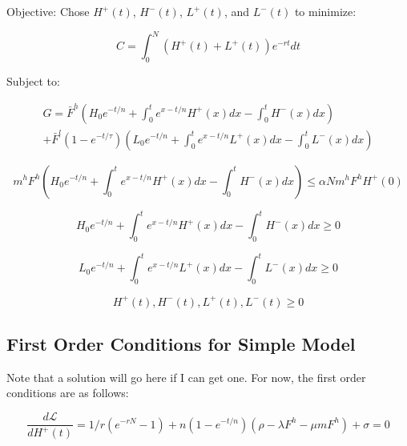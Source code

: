 \documentclass[singlespace]{easychithesis}
\newcommand{\Lagr}{\mathcal{L}}
\begin{document}
Objective: Chose $H^+(t)$, $H^-(t)$, $L^+(t)$, and $L^-(t)$ to minimize:

\begin{equation}\label{eq:analyticalObj}
C = \int_0^N (H^+(t) + L^+(t))e^{-rt} dt
\end{equation}

Subject to: 

\begin{multline}\label{eq:analyticalGen}
G = \bar{F}^h\left (H_0 e^{-t/n} + \int_0^t e^{x-t/n} H^+(x) dx - \int_0^t H^-(x)dx \right) \\ + \bar{F}^l(1-e^{-t/\tau}) \left ( L_0 e^{-t/n} + \int_0^t e^{x-t/n} L^+(x) dx - \int_0^t L^-(x)dx\right )
\end{multline}

\begin{equation}\label{eq:analyticalEmit}
m^hF^h\left (H_0 e^{-t/n} + \int_0^t e^{x-t/n} H^+(x) dx - \int_0^t H^-(x)dx \right) \leq \alpha N m^h F^h H^+(0)
\end{equation}

\begin{equation}\label{eq:analyticalHCapConstraint}
H_0 e^{-t/n} + \int_0^t e^{x-t/n} H^+(x) dx - \int_0^t H^-(x)dx \geq 0 
\end{equation}

\begin{equation}\label{eq:analyticalLCapConstraint}
L_0 e^{-t/n} + \int_0^t e^{x-t/n} L^+(x) dx - \int_0^t L^-(x)dx \geq 0 
\end{equation}

\begin{equation}\label{eq:analyticalDecisionVarConstraint}
H^+(t), H^-(t), L^+(t), L^-(t) \geq 0
\end{equation}


\subsection{First Order Conditions for Simple Model}

Note that a solution will go here if I can get one. For now, the first order conditions are as follows:

\begin{equation}\label{eq:dLdH+}
\frac{d\Lagr}{dH^+(t)} = 1/r(e^{-rN} -1) + n(1-e^{-t/n})(\rho - \lambda F^h -\mu m F^h) + \sigma = 0
\end{equation}
\end{document}

